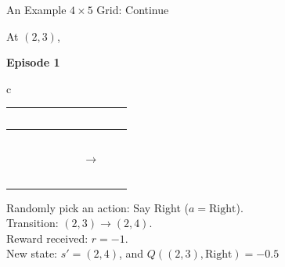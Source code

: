 \documentclass[aspectratio=169,xcolor=dvipsnames,svgnames,x11names,fleqn]{beamer}
\begin{document}
    \begin{frame}{An Example $4\times 5$ Grid: Continue}
        \begin{center}
            At $(2,3)$, 
            
            \vspace{0.5cm}
        
            \textbf{Episode 1}
            
            \vspace{0.5cm}
        
            \begin{tabular}{c}
                 \\
                \begin{tabular}{|c|c|c|c|c|}
                \hline
                ~~ &  ~~ &  ~~  & ~~ & \cellcolor{red!25} \\ %
                \hline
                ~~ & ~~ & \cellcolor{black}  &  ~~ &  ~~  \\ 
                \hline
                ~~ &  & ~~ & \footnotesize \faStar $\to$ & ~~ \\ %
                \hline
                ~~ & ~~  &  ~~ & ~~ & \cellcolor{red!25}  \\ %
                \hline
                \end{tabular}
            \end{tabular}
        
            Randomly pick an action: Say Right ($a = \text{Right}$). \\
            Transition: $(2,3) \rightarrow (2,4)$. \\
            Reward received: $r = -1$. \\
            New state: $s' = (2,4)$, and $Q((2,3), \text{Right})  = -0.5$
        
        \end{center}
    \end{frame}
\end{document}
